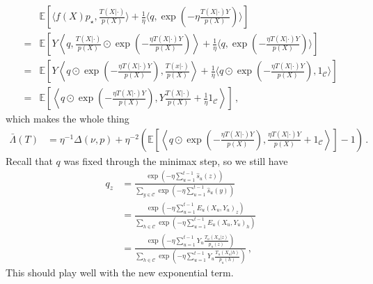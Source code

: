 \documentclass{article}
\theoremstyle{plain}
\theoremstyle{definition}
\theoremstyle{remark}
\newcommand{\E}{\mathbb E}
\newcommand{\cC}{\mathcal C}
\theoremstyle{definition}
\begin{document}
\begin{align*}
      & \E\!\left[
        \langle f(X) p_\star, \tfrac{T(X|\cdot)}{p(X)} \rangle
        + \frac{1}{\eta}
        \langle q, \exp(- \eta \tfrac{T(X|\cdot) Y}{p(X)})\rangle
        \right]
    \\
    = &
    \E\!\left[
        Y
        \left\langle
        q
        , \tfrac{T(X|\cdot)}{p(X)}
        \odot
        \exp(- \tfrac{\eta T(X|\cdot) Y}{p(X)})
        \right\rangle
        + \frac{1}{\eta}
        \langle q, \exp(- \tfrac{\eta T(X|\cdot) Y}{p(X)})\rangle
        \right]
    \\
    = &
    \E\!\left[
        Y
        \left\langle
        q
        \odot
        \exp(- \tfrac{\eta T(X|\cdot) Y}{p(X)})
        , \tfrac{T(x|\cdot)}{p(X)}
        \right\rangle
        + \frac{1}{\eta}
        \langle
        q
        \odot
        \exp(- \tfrac{\eta T(X|\cdot) Y}{p(X)})
        , 1_\cC\rangle
        \right]
    \\
    = &
    \E\!\left[
        \left\langle
        q
        \odot
        \exp(- \tfrac{\eta T(X|\cdot) Y}{p(X)})
        , Y \tfrac{T(X|\cdot)}{p(X)} + \frac{1}{\eta} 1_\cC
        \right\rangle
        \right]\,,
\end{align*}
which makes the whole thing
\begin{align*}
    \bar{\Lambda}(T)
     & =
    \eta^{-1}
    \Delta(\nu, p) +
    \eta^{-2}
    \left(
    \E\!\left[
            \left\langle
            q
            \odot
            \exp(- \tfrac{\eta T(X|\cdot) Y}{p(X)})
            , \tfrac{\eta T(X|\cdot)Y}{p(X)} +  1_\cC
            \right\rangle
            \right]
    -1
    \right)\,.
\end{align*}
Recall that $q$ was fixed through the minimax step, so we still have
\begin{align*}
    q_z & = \frac{\exp(-\eta\sum_{u=1}^{t-1}\hat{s}_u(z))}{\sum_{y\in\cC}\exp(-\eta\sum_{u=1}^{t-1}\hat{s}_u(y))}
    \\
        & = \frac{
        \exp(-\eta\sum_{u=1}^{t-1} E_u(X_u, Y_u)_z)
    }{\sum_{h\in\cC}\exp(-\eta\sum_{u=1}^{t-1}E_u(X_u, Y_u)_h)}
    \\
        & = \frac{
        \exp(-\eta\sum_{u=1}^{t-1} Y_u \tfrac{T_u(X_u|z)}{p_u(z)})
    }{\sum_{h\in\cC}\exp(-\eta\sum_{u=1}^{t-1} Y_u \tfrac{T_u(X_u|h)}{p_u(h)})}\,,
\end{align*}
This should play well with the new exponential term.


\clearpage
\end{document}
